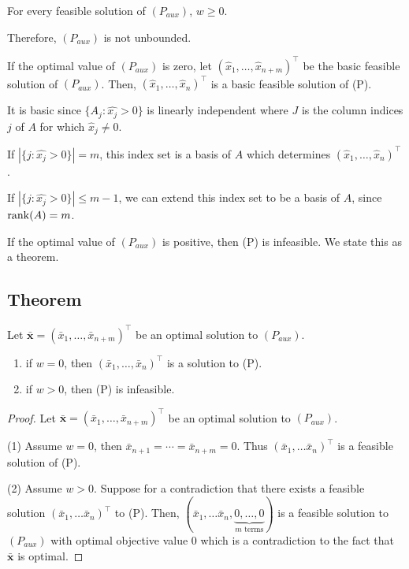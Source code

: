 For every feasible solution of $ (P_{aux}) $, $ w\ge 0 $.

Therefore, $ (P_{aux}) $ is not unbounded.

If the optimal value of $ (P_{aux}) $ is zero, let 
$ (\hat{x}_1,\ldots,\hat{x}_{n+m})^\top$ 
be the basic feasible solution of $ (P_{aux}) $. Then, 
$ (\hat{x}_1,\ldots,\hat{x}_{n})^\top$ 
is a basic feasible solution of (P).

It is basic since $ \{A_j : \hat{x_j}>0\} $ is linearly independent where
$ J $ is the column indices $ j $ of $ A $ for which $ \hat{x}_j\neq 0 $.

If $ |\{j:\hat{x_j}>0\}|=m $, this index set is a basis of $ A $ which
determines $ (\hat{x}_1,\ldots,\hat{x}_{n})^\top$.

If $ |\{j:\hat{x_j}>0\}|\le m-1 $, we can extend this index set
to be a basis of $ A $, since $ \operatorname{rank}(A)=m $.

If the optimal value of $ (P_{aux}) $ is positive, then (P) is
infeasible. We state this as a theorem.

\begin{thmbox}
    \subsection{Theorem}
    Let $ \bar{\bm{x}}=(\bar{x}_1,\ldots ,\bar{x}_{n+m})^\top $ be an optimal solution
    to $ (P_{aux}) $.
    \begin{enumerate}[(1)]
        \item if $ w=0 $, then $ (\bar{x}_1,\ldots,\bar{x}_n)^\top $ is a solution to (P).
        \item if $ w>0 $, then (P) is infeasible.
    \end{enumerate}
\end{thmbox}
\begin{proof}
    Let $ \bar{\bm{x}}=(\bar{x}_1,\ldots ,\bar{x}_{n+m})^\top $ be an optimal solution
    to $ (P_{aux}) $.

    (1) Assume $ w=0 $, then $ \bar{x}_{n+1}=\cdots=\bar{x}_{n+m}=0 $. Thus
    $ (\bar{x}_1,\ldots \bar{x}_n)^\top $ is a feasible solution of (P).

    (2) Assume $ w>0 $. Suppose for a contradiction that there exists a feasible
    solution $(\bar{x}_1,\ldots \bar{x}_n)^\top$ to (P). Then,
    $ (\bar{x}_1,\ldots \bar{x}_n,\underbrace{0,\ldots ,0}_{m\text{ terms}}) $ is a feasible solution to $ (P_{aux}) $
    with optimal objective value $0$ which is a contradiction to the fact that
    $ \bm{\bar{x}} $ is optimal.
\end{proof}

